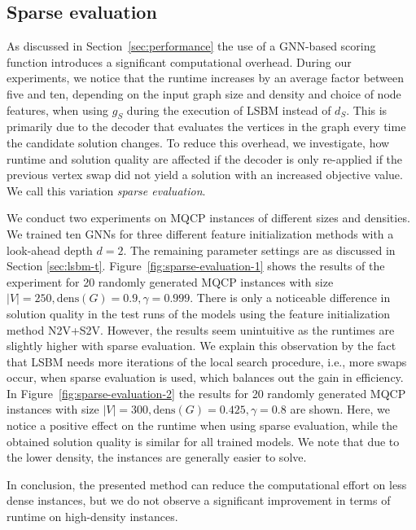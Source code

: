 \documentclass[draft,final]{vutinfth} %
\begin{document}
\subsection{Sparse evaluation}
As discussed in Section~\ref{sec:performance} the use of a GNN-based scoring function introduces a significant computational overhead. During our experiments, we notice that the runtime increases by an average factor between five and ten, depending on the input graph size and density and choice of node features, when using $g_S$ during the execution of LSBM instead of $d_S$. This is primarily due to the decoder that evaluates the vertices in the graph every time the candidate solution changes. 
To reduce this overhead, we investigate, how runtime and solution quality are affected if the decoder is only re-applied if the previous vertex swap did not yield a solution with an increased objective value. We call this variation \emph{sparse evaluation}. 

We conduct two experiments on MQCP instances of different sizes and densities. We trained ten GNNs for three different feature initialization methods with a look-ahead depth $d=2$. The remaining parameter settings are as discussed in Section \ref*{sec:lsbm-t}. 
Figure~\ref{fig:sparse-evaluation-1} shows the results of the experiment for 20 randomly generated MQCP instances with size $|V|=250, \mathrm{dens}(G)=0.9, \gamma=0.999$. There is only a noticeable difference in solution quality in the test runs of the models using the feature initialization method N2V+S2V. However, the results seem unintuitive as the runtimes are slightly higher with sparse evaluation. We explain this observation by the fact that LSBM needs more iterations of the local search procedure, i.e., more swaps occur, when sparse evaluation is used, which balances out the gain in efficiency.  
In Figure~\ref{fig:sparse-evaluation-2} the results for 20 randomly generated MQCP instances with size $|V|=300, \mathrm{dens}(G)=0.425, \gamma=0.8$ are shown. Here, we notice a positive effect on the runtime when using sparse evaluation, while the obtained solution quality is similar for all trained models. We note that due to the lower density, the instances are generally easier to solve. 

In conclusion, the presented method can reduce the computational effort on less dense instances, but we do not observe a significant improvement in terms of runtime on high-density instances. 
\end{document}

